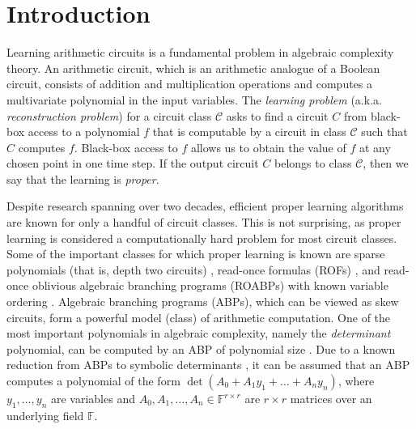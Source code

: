 \documentclass[11pt,letterpaper]{article}
\newcommand{\F}{\mathbb{F}}
\newcommand{\calC}{\mathcal{C}}
\begin{document}
\begin{abstract}
We resolve black-box PMAP by investigating a crucial property of dense matrices that we call the \emph{rank-one extension} property. Understanding ``cuts'' of matrices with this property and designing a \emph{black-box cut-finding} algorithm to solve PMAP for such matrices (using only principal minors of order $4$ or less) constitute the technical core of this work. The insights developed along the way also help us give the first NC algorithm for the \emph{Principal Minor Equivalence} problem, which asks to check if two given matrices have equal corresponding principal minors. 

\end{abstract}

\thispagestyle{empty}
\newpage

\setcounter{tocdepth}{2}
\tableofcontents
\thispagestyle{empty}
\newpage
\setcounter{page}{1}

\section{Introduction}
Learning arithmetic circuits is a fundamental problem in algebraic complexity theory. An arithmetic circuit, which is an arithmetic analogue of a Boolean circuit, consists of addition and multiplication operations and computes a multivariate polynomial in the input variables. The \emph{learning problem} (a.k.a. \emph{reconstruction problem}) for a circuit class $\calC$ asks to find a circuit $C$ from black-box access to a polynomial $f$ that is computable by a circuit in class $\calC$ such that $C$ computes $f$. Black-box access to $f$ allows us to obtain the value of $f$ at any chosen point in one time step. If the output circuit $C$ belongs to class $\calC$, then we say that the learning is \emph{proper}.

Despite research spanning over two decades, efficient proper learning algorithms are known for only a handful of circuit classes. This is not surprising, as proper learning is considered a computationally hard problem for most circuit classes. Some of the important classes for which proper learning is known are sparse polynomials (that is, depth two circuits) \cite{Ben-OrT88, KlivansS01}, read-once formulas (ROFs) \cite{HancockH91, BshoutyHH95, ShpilkaV14, MinahanV18}, and read-once oblivious algebraic branching programs (ROABPs) with known variable ordering \cite{BeimelBBKV00, KlivansS06}. Algebraic branching programs (ABPs), which can be viewed as skew circuits, form a powerful model (class) of arithmetic computation. One of the most important polynomials in algebraic complexity, namely the \emph{determinant} polynomial, can be computed by an ABP of polynomial size \cite{Berkowitz84, MahajanV97}. Due to a known reduction from ABPs to symbolic determinants \cite{Valiant79a}, it can be assumed that an ABP computes a polynomial of the form $\det(A_0 + A_1y_1 + \ldots + A_ny_n)$, where $y_1, \ldots, y_n$ are variables and $A_0, A_1, \ldots, A_n \in \F^{r \times r}$ are $r \times r$ matrices over an underlying field $\F$. 
\end{document}
